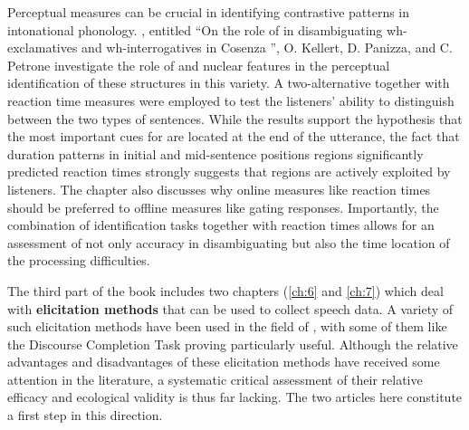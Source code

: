 \documentclass[output=paper]{langsci/langscibook}
\begin{document}
Perceptual measures can be crucial in identifying contrastive patterns in intonational phonology. \textbf{}, entitled ``On the role of  in disambiguating wh-exclamatives and wh-interrogatives in Cosenza ”, O. Kellert, D. Panizza, and C. Petrone investigate the role of  and nuclear  features in the perceptual identification of these structures in this  variety. A two-alternative  together with reaction time measures were employed to test the listeners’ ability to distinguish between the two types of sentences. While the results support the hypothesis that the most important  cues for  are located at the end of the utterance, the fact that duration patterns in initial and mid-sentence positions regions significantly predicted reaction times strongly suggests that  regions are actively exploited by listeners. The chapter also discusses why online measures like reaction times should be preferred to offline measures like gating responses. Importantly, the combination of identification tasks together with reaction times allows for an assessment of not only accuracy in  disambiguating but also the time location of the processing difficulties. 

The third part of the book includes two chapters (\ref{ch:6} and \ref{ch:7}) which deal with \textbf{elicitation methods} that can be used to collect speech data. A variety of such elicitation methods have been used in the field of , with some of them like the Discourse Completion Task proving particularly useful. Although the relative advantages and disadvantages of these elicitation methods have received some attention in the literature, a systematic critical assessment of their relative efficacy and ecological validity is thus far lacking. The two articles here constitute a first step in this direction.
\end{document}
